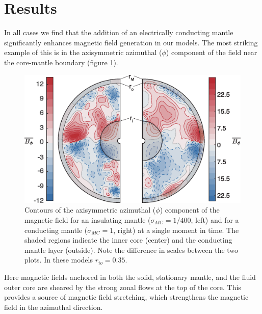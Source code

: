 \section{Results}
In all cases we find that the addition of an electrically conducting mantle significantly enhances magnetic field generation in our models. The most striking example of this is in the axisymmetric azimuthal ($\phi$) component of the field near the core-mantle boundary (figure \ref{fig:toroidal}).
\begin{figure}
\centering \noindent\includegraphics[width=.8\linewidth]{Chapter3/Figures/f2.eps}
\caption{Contours of the axisymmetric azimuthal ($\phi$) component of the magnetic field for an insulating mantle ($\sigma_{MC}=1/400$, left) and for a conducting mantle ($\sigma_{MC}=1$, right) at a single moment in time. The shaded regions indicate the inner core (center) and the conducting mantle layer (outside). Note the difference in scales between the two plots. In these models $r_{io}=0.35$.}
\label{fig:toroidal}
\end{figure}
Here magnetic fields anchored in both the solid, stationary mantle, and the fluid outer core are sheared by the strong zonal flows at the top of the core. This provides a source of magnetic field stretching, which strengthens the magnetic field in the azimuthal direction.

